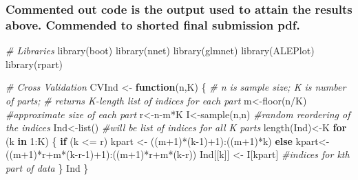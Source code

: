 \documentclass[
]{article}
\newenvironment{Shaded}{\begin{snugshade}}{\end{snugshade}}
\newcommand{\CommentTok}[1]{\textcolor[rgb]{0.56,0.35,0.01}{\textit{#1}}}
\newcommand{\ControlFlowTok}[1]{\textcolor[rgb]{0.13,0.29,0.53}{\textbf{#1}}}
\newcommand{\DecValTok}[1]{\textcolor[rgb]{0.00,0.00,0.81}{#1}}
\newcommand{\FunctionTok}[1]{\textcolor[rgb]{0.00,0.00,0.00}{#1}}
\newcommand{\NormalTok}[1]{#1}
\newcommand{\OtherTok}[1]{\textcolor[rgb]{0.56,0.35,0.01}{#1}}
\newcommand{\SpecialCharTok}[1]{\textcolor[rgb]{0.00,0.00,0.00}{#1}}
\begin{document}
\hypertarget{commented-out-code-is-the-output-used-to-attain-the-results-above.-commended-to-shorted-final-submission-pdf.}{%
\subsubsection{Commented out code is the output used to attain the
results above. Commended to shorted final submission
pdf.}\label{commented-out-code-is-the-output-used-to-attain-the-results-above.-commended-to-shorted-final-submission-pdf.}}

\begin{Shaded}
\begin{Highlighting}[]
\CommentTok{\# Libraries}
\FunctionTok{library}\NormalTok{(boot)}
\FunctionTok{library}\NormalTok{(nnet)}
\FunctionTok{library}\NormalTok{(glmnet)}
\FunctionTok{library}\NormalTok{(ALEPlot)}
\FunctionTok{library}\NormalTok{(rpart)}

\CommentTok{\# Cross Validation}
\NormalTok{CVInd }\OtherTok{\textless{}{-}} \ControlFlowTok{function}\NormalTok{(n,K) \{ }
  \CommentTok{\# n is sample size; K is number of parts; }
  \CommentTok{\# returns K{-}length list of indices for each part}
\NormalTok{  m}\OtherTok{\textless{}{-}}\FunctionTok{floor}\NormalTok{(n}\SpecialCharTok{/}\NormalTok{K) }\CommentTok{\#approximate size of each part}
\NormalTok{  r}\OtherTok{\textless{}{-}}\NormalTok{n}\SpecialCharTok{{-}}\NormalTok{m}\SpecialCharTok{*}\NormalTok{K}
\NormalTok{  I}\OtherTok{\textless{}{-}}\FunctionTok{sample}\NormalTok{(n,n) }\CommentTok{\#random reordering of the indices}
\NormalTok{  Ind}\OtherTok{\textless{}{-}}\FunctionTok{list}\NormalTok{() }\CommentTok{\#will be list of indices for all K parts}
  \FunctionTok{length}\NormalTok{(Ind)}\OtherTok{\textless{}{-}}\NormalTok{K}
  \ControlFlowTok{for}\NormalTok{ (k }\ControlFlowTok{in} \DecValTok{1}\SpecialCharTok{:}\NormalTok{K) \{}
    \ControlFlowTok{if}\NormalTok{ (k }\SpecialCharTok{\textless{}=}\NormalTok{ r) kpart }\OtherTok{\textless{}{-}}\NormalTok{ ((m}\SpecialCharTok{+}\DecValTok{1}\NormalTok{)}\SpecialCharTok{*}\NormalTok{(k}\DecValTok{{-}1}\NormalTok{)}\SpecialCharTok{+}\DecValTok{1}\NormalTok{)}\SpecialCharTok{:}\NormalTok{((m}\SpecialCharTok{+}\DecValTok{1}\NormalTok{)}\SpecialCharTok{*}\NormalTok{k)}
    \ControlFlowTok{else}\NormalTok{ kpart}\OtherTok{\textless{}{-}}\NormalTok{((m}\SpecialCharTok{+}\DecValTok{1}\NormalTok{)}\SpecialCharTok{*}\NormalTok{r}\SpecialCharTok{+}\NormalTok{m}\SpecialCharTok{*}\NormalTok{(k}\SpecialCharTok{{-}}\NormalTok{r}\DecValTok{{-}1}\NormalTok{)}\SpecialCharTok{+}\DecValTok{1}\NormalTok{)}\SpecialCharTok{:}\NormalTok{((m}\SpecialCharTok{+}\DecValTok{1}\NormalTok{)}\SpecialCharTok{*}\NormalTok{r}\SpecialCharTok{+}\NormalTok{m}\SpecialCharTok{*}\NormalTok{(k}\SpecialCharTok{{-}}\NormalTok{r))}
\NormalTok{    Ind[[k]] }\OtherTok{\textless{}{-}}\NormalTok{ I[kpart] }\CommentTok{\#indices for kth part of data}
\NormalTok{  \}}
\NormalTok{  Ind}
\NormalTok{\}}


\end{Highlighting}
\end{Shaded}
\end{document}
